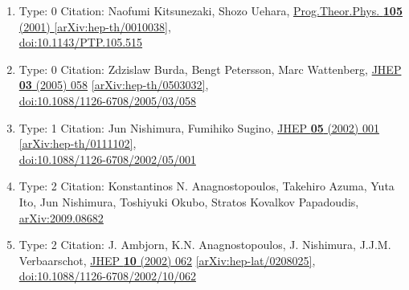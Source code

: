 \documentclass[a4paper,10pt]{article}
\begin{document}
\begin{enumerate}
\begin{enumerate}
  \item Type: 0 Citation: Naofumi Kitsunezaki, Shozo Uehara, \href{https://www.doi.org/10.1143/PTP.105.515}{Prog.Theor.Phys. {\bf 105} (2001) }  \href{https://arxiv.org/abs/hep-th/0010038}{[arXiv:hep-th/0010038]},\\\href{https://www.doi.org/10.1143/PTP.105.515}{doi:10.1143/PTP.105.515}
  \item Type: 0 Citation: Zdzislaw Burda, Bengt Petersson, Marc Wattenberg, \href{https://www.doi.org/10.1088/1126-6708/2005/03/058}{JHEP {\bf 03} (2005) 058}  \href{https://arxiv.org/abs/hep-th/0503032}{[arXiv:hep-th/0503032]},\\\href{https://www.doi.org/10.1088/1126-6708/2005/03/058}{doi:10.1088/1126-6708/2005/03/058}
  \item Type: 1 Citation: Jun Nishimura, Fumihiko Sugino, \href{https://www.doi.org/10.1088/1126-6708/2002/05/001}{JHEP {\bf 05} (2002) 001}  \href{https://arxiv.org/abs/hep-th/0111102}{[arXiv:hep-th/0111102]},\\\href{https://www.doi.org/10.1088/1126-6708/2002/05/001}{doi:10.1088/1126-6708/2002/05/001}
  \item Type: 2 Citation: Konstantinos N. Anagnostopoulos, Takehiro Azuma, Yuta Ito, Jun Nishimura, Toshiyuki Okubo, Stratos Kovalkov Papadoudis, \href{https://arxiv.org/abs/2009.08682}{arXiv:2009.08682}
  \item Type: 2 Citation: J. Ambjorn, K.N. Anagnostopoulos, J. Nishimura, J.J.M. Verbaarschot, \href{https://www.doi.org/10.1088/1126-6708/2002/10/062}{JHEP {\bf 10} (2002) 062}  \href{https://arxiv.org/abs/hep-lat/0208025}{[arXiv:hep-lat/0208025]},\\\href{https://www.doi.org/10.1088/1126-6708/2002/10/062}{doi:10.1088/1126-6708/2002/10/062}

\end{enumerate}
\end{enumerate}
\end{document}
